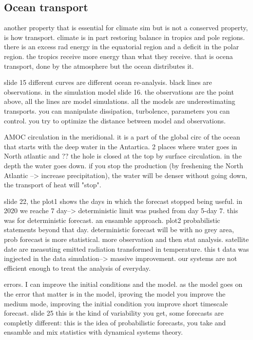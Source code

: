 \subsection{Ocean transport}
another property that is essential for climate sim but is not a conserved property, is how transport. climate is in part restoring balance in tropics and pole regions. there is an excess rad energy in the equatorial region and a deficit in the polar region. the tropics receive more energy than what they receive. that is ocena transport, done by the atmosphere but the ocean distributes it. 


slide 15 different curves are different ocean re-analysis. black lines are observations. 
in the simulation model slide 16. the observations are the point above, all the lines are model simulations. all the models are underestimating transports. you can manipulate dissipation, turbolence, parameters you can control. you try to optimize the distance between model and observations. 


AMOC circulation in the meridional. it is a part of the global circ of the ocean that starts with the deep water in the Antartica. 2 places where water goes in North atlantic and ?? the hole is closed at the top by surface circulation. in the depth the water goes down. if you stop the production (by freshening the North Atlantic --> increase precipitation), the water will be denser without going down, the transport of heat will "stop". 


slide 22, the plot1 shows the days in which the forecast stopped being useful. in 2020 we reache 7 day--> deterministic limit was pushed from day 5-day 7. this was for deterministic forecast. an ensamble approach. plot2 probabilistic statements beyond that day. deterministic forecast will be with no grey area, prob forecast is more statistical. more observation and then stat analysis. satellite date are measuting emitted radiation transformed in temperature. this t data was ingjected in the data simulation--> massive improvement. our systems are not efficient enough to treat the analysis of everyday. 

errors. I can improve the initial conditions and the model. as the model goes on the error that matter is in the model, iproving the model you improve the medium mode, improving the initial condition you improve short timescale forecast. slide 25 this is the kind of variability you get, some forecasts are completly different: this is the idea of probabilistic forecasts, you take and ensamble and mix statistics with dynamical systems theory. 


